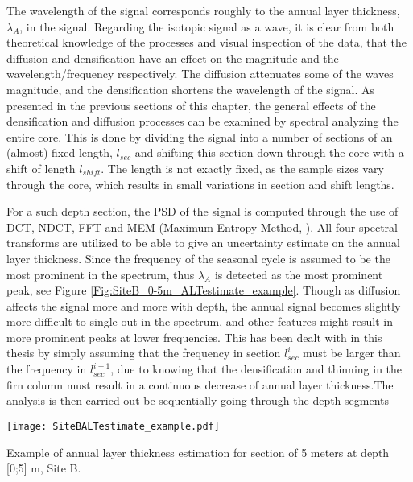 \documentclass[../../CompleteThesis2/Complete_2ndDraft]{subfiles}
\begin{document}
The wavelength of the signal corresponds roughly to the annual layer thickness, $\lambda_A$, in the signal. Regarding the isotopic signal as a wave, it is clear from both theoretical knowledge of the processes and visual inspection of the data, that the diffusion and densification have an effect on the magnitude and the wavelength/frequency respectively. The diffusion attenuates some of the waves magnitude, and the densification shortens the wavelength of the signal. As presented in the previous sections of this chapter, the general effects of the densification and diffusion processes can be examined by spectral analyzing the entire core. This is done by dividing the signal into a number of sections of an (almost) fixed length, $l_{sec}$ and shifting this section down through the core with a shift of length $l_{shift}$. The length is not exactly fixed, as the sample sizes vary through the core, which results in small variations in section and shift lengths.


For a such depth section, the PSD of the signal is computed through the use of DCT, NDCT, FFT and MEM (Maximum Entropy Method, \cite[T. Ulrych and T. Bishop, 1975]{MEMSpectralAnalysis}). All four spectral transforms are utilized to be able to give an uncertainty estimate on the annual layer thickness. Since the frequency of the seasonal cycle is assumed to be the most prominent in the spectrum, thus $\lambda_A$ is detected as the most prominent peak, see Figure \ref{Fig:SiteB_0-5m_ALTestimate_example}. Though as diffusion affects the signal more and more with depth, the annual signal becomes slightly more difficult to single out in the spectrum, and other features might result in more prominent peaks at lower frequencies. This has been dealt with in this thesis by simply assuming that the frequency in section $l_{sec}^i$ must be larger than the frequency in $l_{sec}^{i-1}$, due to knowing that the densification and thinning in the firn column must result in a continuous decrease of annual layer thickness.The analysis is then carried out be sequentially going through the depth segments


\begin{marginfigure}
	\centering
	\texttt{[image: SiteBALTestimate\_example.pdf]}
	\caption[$\lambda$ estimation example, Site B, in frequency domain]{\footnotesize Example of annual layer thickness estimation for section of 5 meters at depth [0;5] m, Site B.}
	\label{Fig:SiteB_0-5m_ALTestimate_example}
\end{marginfigure}
%
\end{document}
